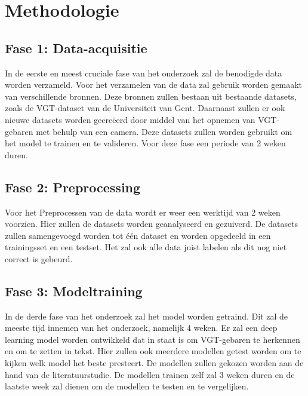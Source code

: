 
\section{Methodologie}%
\label{sec:methodologie}
\subsection{Fase 1: Data-acquisitie}
In de eerste en meest cruciale fase van het onderzoek zal de benodigde data worden verzameld.
Voor het verzamelen van de data zal gebruik worden gemaakt van verschillende bronnen.
Deze bronnen zullen bestaan uit bestaande datasets, zoals de VGT-dataset van de Universiteit van Gent.
Daarnaast zullen er ook nieuwe datasets worden gecreëerd door middel van het opnemen van VGT-gebaren met behulp van een camera.
Deze datasets zullen worden gebruikt om het model te trainen en te valideren.
Voor deze fase een periode van 2 weken duren. 
\subsection{Fase 2: Preprocessing}
Voor het Preprocessen van de data wordt er weer een werktijd van 2 weken voorzien.
Hier zullen de datasets worden geanalyseerd en gezuiverd.
De datasets zullen samengevoegd worden tot één dataset en worden opgedeeld in een trainingsset en een testset.
Het zal ook alle data juist labelen als dit nog niet correct is gebeurd.
\subsection{Fase 3: Modeltraining}
In de derde fase van het onderzoek zal het model worden getraind.
Dit zal de meeste tijd innemen van het onderzoek, namelijk 4 weken. 
Er zal een deep learning model worden ontwikkeld dat in staat is om VGT-gebaren te herkennen en om te zetten in tekst.
Hier zullen ook meerdere modellen getest worden om te kijken welk model het beste presteert.
De modellen zullen gekozen worden aan de hand van de literatuurstudie.
De modellen trainen zelf zal 3 weken duren en de laatste week zal dienen om de modellen te testen en te vergelijken.
